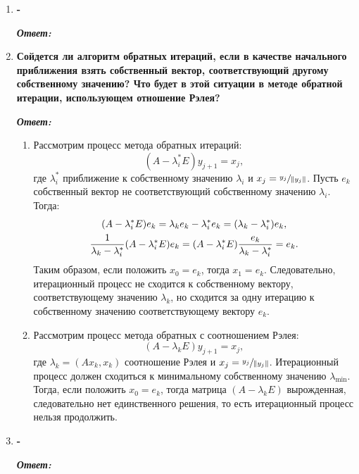 \documentclass[12pt, a4paper]{article}
\newcommand{\norm}[1]{\lVert #1 \rVert}
\begin{document}
\begin{enumerate}
	
	\item \textbf{-}
	\vspace*{0.2cm}
	
	\textit{\textbf{Ответ:}}
	
	\item \textbf{Сойдется ли алгоритм обратных итераций, если в качестве начального приближения взять собственный вектор, соответствующий другому собственному значению? Что будет в этой ситуации в методе обратной итерации, использующем отношение Рэлея?}
	
	\vspace*{0.2cm}
	
	\textit{\textbf{Ответ:}}
	\begin{enumerate}
		\item Рассмотрим процесс метода обратных итераций:
		\[
		(A - \lambda^{*}_i E)y_{j+1} = x_j,
		\] 
		 где $\lambda^{*}_i$ приближение к собственному значению $\lambda_i$ и $x_{j} = \sfrac{y_j}{\norm{y_{j}}}$. Пусть $e_k$ собственный вектор не соответствующий собственному значению $\lambda_i$. Тогда:
		 \begin{gather}
		 (A - \lambda^{*}_i E) e_k = \lambda_k e_k - \lambda^*_i e_k = (\lambda_k - \lambda^*_i) e_k, \notag \\
		 \frac{1}{\lambda_k - \lambda^*_i}(A - \lambda^{*}_i E) e_k = (A - \lambda^{*}_i E)\frac{e_k}{\lambda_k - \lambda^*_i} =  e_k.
		 \end{gather}
		 Таким образом, если положить $x_0 = e_k$, тогда $x_1 = e_k$. Следовательно, итерационный процесс не сходится к собственному вектору, соответствующему значению  $\lambda_k$, но сходится за одну итерацию к собственному значению соответствующему вектору $e_k$.
		 
		 \item Рассмотрим процесс метода обратных с соотношением Рэлея:
		 \[
		 (A - \lambda_k E)y_{j+1} = x_j,
		 \] 
		 где $\lambda_k = (A x_k, x_k)$ соотношение Рэлея и $x_{j} = \sfrac{y_j}{\norm{y_{j}}}$. Итерационный процесс должен сходиться к минимальному собственному значению $\lambda_\text{min}$. Тогда, если положить $x_0 = e_k$, тогда матрица $(A - \lambda_k E)$ вырожденная, следовательно нет единственного решения, то есть итерационный процесс нельзя продолжить.
	\end{enumerate}
	
	\item \textbf{-}
	\vspace*{0.2cm}
	
	\textit{\textbf{Ответ:}}
	

\end{enumerate}
\end{document}
